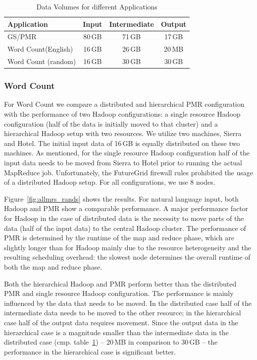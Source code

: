 \documentclass[12pt]{report}
\newcommand{\upp}{\vspace*{-0.5em}}
\begin{document}
\begin{table}[ht]
	\centering
\begin{tabular}{|p{2cm}|c|c|c|}
\hline
\textbf{Application} &\textbf{Input} &\textbf{Intermediate} &\textbf{Output}\\
\hline
GS/PMR 		&80\,GB &71\,GB		 &17\,GB\\
\hline
Word Count\linebreak[4] (English) &16\,GB&26\,GB&20\,MB\\
\hline
Word Count (random) &16\,GB&30\,GB&30\,GB\\
\hline
\end{tabular}
\caption{Data Volumes for different Applications\upp}
\label{tab:data-volumes}
\end{table}

\upp\upp
\subsubsection{Word Count}

For Word Count we compare a distributed and hierarchical PMR
configuration with the performance of two Hadoop configurations: a
single resource Hadoop configuration (half of the data is initially
moved to that cluster) and a hierarchical Hadoop setup with two
resources. We utilize two machines, Sierra and Hotel. The initial
input data of 16\,GB is equally distributed on these two machines. As
mentioned, for the single resource Hadoop configuration half of the
input data needs to be moved from Sierra to Hotel prior to running the
actual MapReduce job. Unfortunately, the FutureGrid firewall rules
prohibited the usage of a distributed Hadoop setup. For all
configurations, we use 8 nodes.

Figure~\ref{fig:allmrs_rands} shows the results. For natural language
input, both Hadoop and PMR show a comparable performance. A major
performance factor for Hadoop in the case of distributed data is the
necessity to move parts of the data (half of the input data) to the
central Hadoop cluster. The performance of PMR is determined by the
runtime of the map and reduce phase, which are slightly longer than
for Hadoop mainly due to the resource heterogeneity and the resulting
scheduling overhead: the slowest node determines the overall runtime
of both the map and reduce phase.

Both the hierarchical Hadoop and PMR perform better than the
distributed PMR and single resource Hadoop configuration. The
performance is mainly influenced by the data that needs to be
moved. In the distributed case half of the intermediate data needs to
be moved to the other resource; in the hierarchical case half of the
output data requires movement. Since the output data in the
hierarchical case is a magnitude smaller than the intermediate data in
the distributed case (cmp. table~\ref{tab:data-volumes}) -- 20\,MB in
comparison to 30\,GB -- the performance in the hierarchical case is
significant better.
\end{document}
